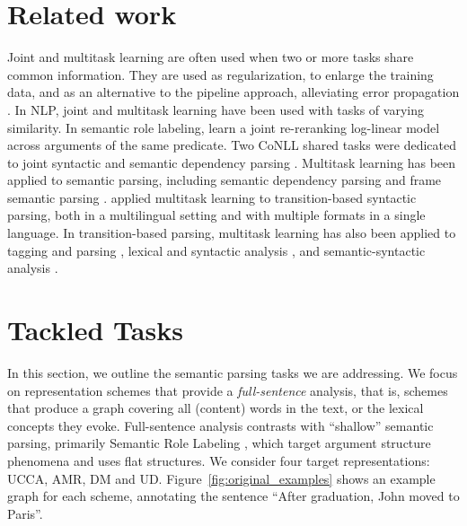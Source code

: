 \documentclass[11pt,a4paper]{article}
\begin{document}
\section{Related work}\label{sec:related_work}


Joint and multitask learning are often used
when two or more tasks share common information.
They are used as regularization, to enlarge the training data,
and as an alternative to the pipeline approach, alleviating error propagation
\cite{collobert2008unified}.
In NLP, joint and multitask learning have been used with tasks of varying
similarity.
In semantic role labeling, \citet{toutanova2005joint}
learn a joint re-reranking log-linear model across arguments of the same predicate.
Two CoNLL shared tasks were dedicated to joint syntactic and semantic
dependency parsing \cite{surdeanu2008conll,hajivc2009conll}.
Multitask learning has been applied to semantic parsing, including
semantic dependency parsing \cite{P17-1186} and
frame semantic parsing \cite{swayamdipta2017frame}.
\citet{guo2016exploiting} applied multitask learning to transition-based
syntactic parsing,
both in a multilingual setting and with multiple formats in a single language.
In transition-based parsing, multitask learning has also been applied to
tagging and parsing \cite{bohnet2012transition,Zhang2016StackpropagationIR},
lexical and syntactic analysis \cite{constant-nivre:2016:P16-1,more2016joint},
and semantic-syntactic analysis \cite{swayamdipta-EtAl:2016:CoNLL,henderson2013multilingual}.


\section{Tackled Tasks}\label{sec:tasks}

In this section, we outline the semantic parsing tasks we are addressing.
We focus on representation schemes that provide a \textit{full-sentence} analysis,
that is, schemes that produce a graph covering all (content) words in the text, or the
lexical concepts they evoke.
Full-sentence analysis contrasts with ``shallow'' semantic parsing,
primarily Semantic Role Labeling
\cite[SRL;][]{Palmer:05,gildea2002automatic,swayamdipta2017frame,ringgaard2017sling},
which target argument structure phenomena and uses flat structures.
We consider four target representations: UCCA, AMR, DM and UD.
Figure~\ref{fig:original_examples} shows an example graph for each scheme,
annotating the sentence ``After graduation, John moved to Paris''.
\end{document}
